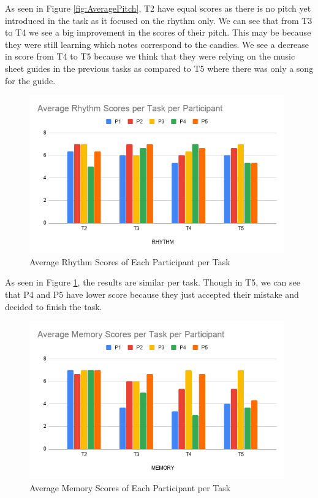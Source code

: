 As seen in Figure \ref{fig:AveragePitch}, T2 have equal scores as there is no pitch yet introduced in the task as it focused on the rhythm only. We can see that from T3 to T4 we see a big improvement in the scores of their pitch. This may be because they were still learning which notes correspond to the candies. We see a decrease in score from T4 to T5 because we think that they were relying on the music sheet guides in the previous tasks as compared to T5 where there was only a song for the guide. 

\begin{figure}[H]
    \centering
    \includegraphics[width=11cm]{figures/Results/AverageRhythm.png}
    \caption{Average Rhythm Scores of Each Participant per Task}
    \label{fig:AverageRhythm}
\end{figure}

As seen in Figure \ref{fig:AverageRhythm}, the results are similar per task. Though in T5, we can see that P4 and P5 have lower score because they just accepted their mistake and decided to finish the task.

\begin{figure}[H]
    \centering
    \includegraphics[width=11cm]{figures/Results/AverageMemory.png}
    \caption{Average Memory Scores of Each Participant per Task}
    \label{fig:AverageMemory}
\end{figure}

